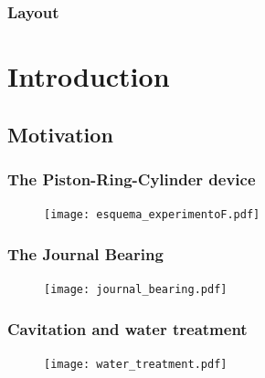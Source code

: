 \documentclass[10pt,aspectratio=169]{beamer}
\begin{document}
\setcounter{showProgressBar}{0}
\setcounter{showSlideNumbers}{1}

\frame{\titlepage}



\begin{frame}
\frametitle{Layout}
\tableofcontents[hideallsubsections]
\end{frame}

\section{Introduction}
\subsection{Motivation}


\begin{frame}
\frametitle{The Piston-Ring-Cylinder device}
\vspace*{0.5cm}
\begin{figure}\hspace*{-0.3cm}
	\texttt{[image: esquema\_experimentoF.pdf]}
\end{figure}
\end{frame}

\begin{frame}
\frametitle{The Journal Bearing}
\vspace*{0.7cm}
\begin{figure}
	\centering
	\texttt{[image: journal\_bearing.pdf]}
\end{figure}

\end{frame}

\begin{frame}
\frametitle{Cavitation and water treatment}
\vspace*{0.5cm}
\begin{minipage}{\linewidth}
\begin{figure}
	\texttt{[image: water\_treatment.pdf]}
\end{figure}
\end{minipage}
\end{frame}


\end{document}
